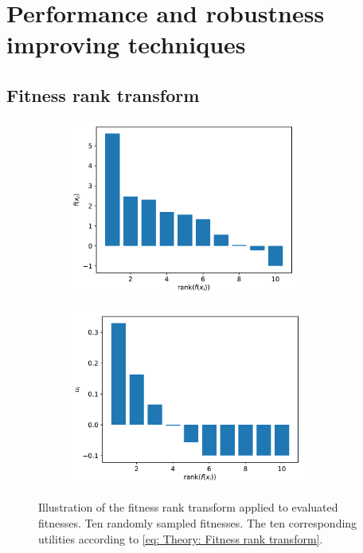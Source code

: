 
\section{Performance and robustness improving techniques}\label{sec: Theory: Performance and robustness improving techniques}

\subsection{Fitness rank transform}\label{sec: Theory: Performance and robustness improving techniques: Fitness rank transform}
\begin{figure}[tbp!]
    \begin{subfigure}[b]{0.485\textwidth}
        \centering
        \includegraphics[height=5.8cm]{graphics/fitness-transform/fitnesses.pdf}
        \caption{}
        \label{fig: Theory: fitness-transform/fitnesses.pdf}
    \end{subfigure}
    \hfill
    \begin{subfigure}[b]{0.495\textwidth}
        \centering
        \includegraphics[height=5.8cm]{graphics/fitness-transform/transform.pdf}
        \caption{}
        \label{fig: Theory: fitness-transform/transform.pdf}
    \end{subfigure}
    \caption{
        Illustration of the fitness rank transform applied to evaluated fitnesses.
         Ten randomly sampled fitnesses. 
         The ten corresponding utilities according to \eqref{eq: Theory: Fitness rank transform}.
    }
    \label{fig: Theory: fitness-transform}
\end{figure}
